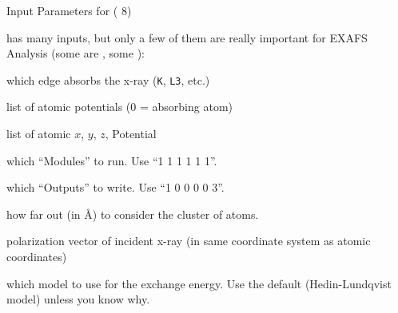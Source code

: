 \begin{slide}{Input Parameters for {  ({\feff} 8)}}

\begin{cenpage}{100mm}
  {\feff} has many  inputs, but only a few of them are really
  important for EXAFS Analysis (some are {}, some {}):

  \begin{description}[POTENTIALSXX]
  \item[{\Red{\texttt{EDGE}}}]   which edge  absorbs  the x-ray ({\tt{K}}, {\tt{L3}}, etc.)

  \item[{\Red{\texttt{POTENTIALS}}}]   list of atomic potentials (0 = absorbing atom)

  \item[{\Red{\texttt{ATOMS}}}]   list of atomic $x$, $y$, $z$, Potential

  \item[{\Red{\texttt{CONTROL}}}]   which ``Modules'' to run.  Use  ``1 1 1 1 1 1''.

  \item[{\Red{\texttt{PRINT}}}]   which ``Outputs'' to write. Use  ``1 0 0  0 0 3''.


  \item[{\Blue{\texttt{RPATH}}}]   how far out (in {\AA}) to consider the  cluster of atoms.

  \item[{\Blue{\texttt{POLARIZATION}}}]   polarization vector of incident
    x-ray (in same coordinate system as atomic coordinates)

  \item[{\Blue{\texttt{EXCHANGE}}}]   which model to use for the exchange energy.
    Use the default (Hedin-Lundqvist model) unless you know why.

  \end{description}

\end{cenpage}

\end{slide}




